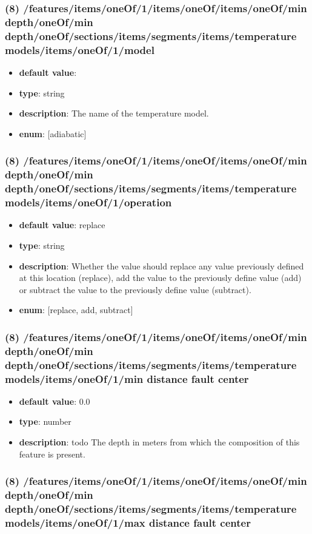 \subsubsection{(8) /features/items/oneOf/1/items/oneOf/items/oneOf/min depth/oneOf/min depth/oneOf/sections/items/segments/items/temperature models/items/oneOf/1/model}
\begin{itemize}[leftmargin=8em]\item {\bf default value}: 
\item {\bf type}: string
\item {\bf description}: The name of the temperature model.
\item {\bf enum}: [adiabatic]\end{itemize}\subsubsection{(8) /features/items/oneOf/1/items/oneOf/items/oneOf/min depth/oneOf/min depth/oneOf/sections/items/segments/items/temperature models/items/oneOf/1/operation}
\begin{itemize}[leftmargin=8em]\item {\bf default value}: replace
\item {\bf type}: string
\item {\bf description}: Whether the value should replace any value previously defined at this location (replace), add the value to the previously define value (add) or subtract the value to the previously define value (subtract).
\item {\bf enum}: [replace, add, subtract]\end{itemize}\subsubsection{(8) /features/items/oneOf/1/items/oneOf/items/oneOf/min depth/oneOf/min depth/oneOf/sections/items/segments/items/temperature models/items/oneOf/1/min distance fault center}
\begin{itemize}[leftmargin=8em]\item {\bf default value}: 0.0
\item {\bf type}: number
\item {\bf description}: todo The depth in meters from which the composition of this feature is present.
\end{itemize}\subsubsection{(8) /features/items/oneOf/1/items/oneOf/items/oneOf/min depth/oneOf/min depth/oneOf/sections/items/segments/items/temperature models/items/oneOf/1/max distance fault center}
